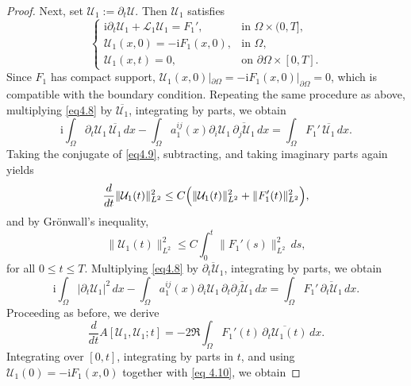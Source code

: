 \documentclass[11pt,reqno,oneside]{amsart}
\numberwithin{equation}{section}
\theoremstyle{definition}
\theoremstyle{remark}
\numberwithin{equation}{section}
\begin{document}
\begin{proof}
		Next, set $\mathcal{U}_{1}:=\partial_t\mathcal{U}$. Then $\mathcal{U}_{1}$ satisfies
		\begin{equation}\label{eq4.8}
			\begin{cases}
				\mathrm{i}\partial_t\mathcal{U}_{1}+\mathcal{L}_1\mathcal{U}_{1}=F_1', &\text{in }\Omega\times(0,T],\\[2mm]
				\mathcal{U}_{1}(x,0)=-\mathrm{i}F_{1}(x,0), &\text{in }\Omega,\\[2mm]
				\mathcal{U}_{1}(x,t)=0, &\text{on }\partial\Omega\times[0,T].
			\end{cases}
		\end{equation}
		Since $F_1$ has compact support, $\mathcal{U}_1(x,0)|_{\partial\Omega}
		= -\mathrm{i}F_1(x,0)|_{\partial\Omega}=0$, which is compatible with the boundary condition. Repeating the same procedure as above, multiplying \eqref{eq4.8} by $\overline{\mathcal{U}_1}$, integrating by parts, we obtain
		\begin{equation}\label{eq4.9}
			\mathrm{i}\int_{\Omega}\partial_{t}\mathcal{U}_1\,
			\overline{\mathcal{U}_1}\,dx
			-\int_{\Omega}a^{ij}_{1}(x)\partial_{i}\mathcal{U}_1\,
			\overline{\partial_{j}\mathcal{U}_1}\,dx
			=\int_{\Omega}F_1'\,\overline{\mathcal{U}_1}\,dx .
		\end{equation}
		Taking the conjugate of \eqref{eq4.9}, subtracting, and taking imaginary parts again yields
		\[
		\frac{d}{dt}\|\mathcal{U}_1(t)\|_{L^{2}}^{2}
		\le C\Bigl(\|\mathcal{U}_1(t)\|_{L^{2}}^{2}
		+\|F_1'(t)\|_{L^{2}}^{2}\Bigr),
		\]
		and by Grönwall's inequality,
		\begin{equation}\label{eq 4.10}
			\|\mathcal{U}_1(t)\|_{L^{2}}^{2}
			\le C\int_{0}^{t}
			\|F_1'(s)\|_{L^{2}}^{2}\,ds ,
		\end{equation}
		for all $0\le t\le T$. Multiplying \eqref{eq4.8} by $\overline{\partial_t\mathcal{U}_1}$, integrating by parts, we obtain
		\begin{equation*}\label{eq4.11}
			\mathrm{i}\int_{\Omega}|\partial_{t}\mathcal{U}_1|^{2}\,dx
			-\int_{\Omega}a^{ij}_{1}(x)\partial_{i}\mathcal{U}_1\,
			\partial_{t}\overline{\partial_{j}\mathcal{U}_1}\,dx
			=\int_{\Omega}F_1'\,\overline{\partial_t\mathcal{U}_1}\,dx .
		\end{equation*}
		Proceeding as before, we derive
		\[
		\frac{d}{dt}A[\mathcal{U}_1,\mathcal{U}_1;t]
		= -2\Re\int_{\Omega}F_1'(t)\,
		\overline{\partial_t \mathcal{U}_1(t)}\,dx .
		\]
		Integrating over $[0,t]$, integrating by parts in $t$, and using
		$\mathcal{U}_1(0)=-\mathrm{i}F_1(x,0)$ together with \eqref{eq 4.10}, we obtain

\end{proof}
\end{document}
